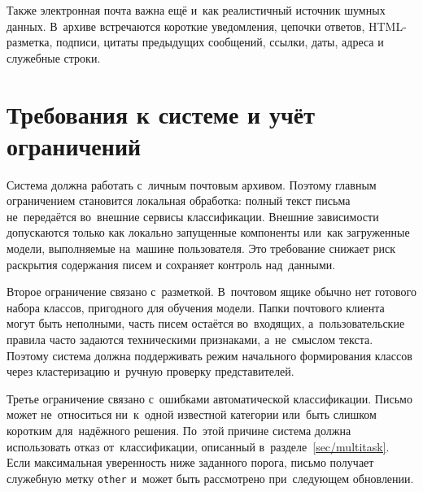 Также электронная почта важна ещё и~как реалистичный источник
шумных данных. В~архиве встречаются короткие уведомления, цепочки ответов,
HTML-разметка, подписи, цитаты предыдущих сообщений, ссылки, даты, адреса и
служебные строки.

\section{Требования к системе и учёт ограничений}\label{sec:ch2/requirements}

Система должна работать с~личным почтовым архивом. Поэтому главным ограничением
становится локальная обработка: полный текст письма не~передаётся во~внешние
сервисы классификации. Внешние зависимости допускаются только как локально
запущенные компоненты или~как загруженные модели, выполняемые на~машине
пользователя. Это требование снижает риск раскрытия содержания писем и
сохраняет контроль над~данными.

Второе ограничение связано с~разметкой. В~почтовом ящике обычно нет готового
набора классов, пригодного для обучения модели. Папки почтового клиента могут
быть неполными, часть писем остаётся во~входящих, а~пользовательские правила
часто задаются техническими признаками, а~не~смыслом текста. Поэтому система
должна поддерживать режим начального формирования классов через кластеризацию
и~ручную проверку представителей.

Третье ограничение связано с~ошибками автоматической классификации. Письмо
может не~относиться ни~к~одной известной категории или~быть слишком коротким
для~надёжного решения. По~этой причине система должна использовать отказ
от~классификации, описанный в~разделе~\ref{sec/multitask}. Если максимальная
уверенность ниже заданного порога, письмо получает служебную метку
\texttt{other} и~может быть рассмотрено при~следующем обновлении.

